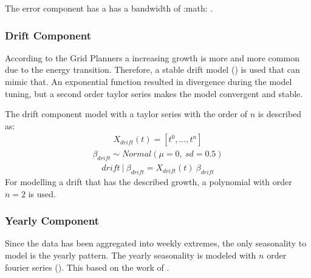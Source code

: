 \documentclass[letterpaper,10pt,english]{sphinxmanual}
\begin{document}
The error component has a has a bandwidth of :math: .


\subsubsection{Drift Component}
\label{\detokenize{modeling:drift-component}}
According to the Grid Planners a increasing growth is more and more common due to the energy transition.
Therefore, a stable drift model ({\hyperref[\detokenize{autoapi/src/model/model/index:src.model.model.drift_model}]{}}) is used that can mimic that.
An exponential function resulted in divergence during the model tuning, but a second order taylor series makes the model convergent and stable.

The drift component model with a taylor series with the order of \(n\) is described as:
\begin{equation*}
\begin{split}X_{drift}(t) = [t^0, ...,  t^n]\end{split}
\end{equation*}\begin{equation*}
\begin{split}\beta_{drift} \sim Normal(\mu=0, \:sd=0.5)\end{split}
\end{equation*}\begin{equation*}
\begin{split}drift\:|\:\beta_{drift} = X_{drift}(t)\:\beta_{drift}\end{split}
\end{equation*}
For modelling a drift that has the described growth, a polynomial with order \(n=2\) is used.


\subsubsection{Yearly Component}
\label{\detokenize{modeling:yearly-component}}
Since the data has been aggregated into weekly extremes, the only seasonality to model is the yearly pattern.
The yearly seasonality is modeled with \(n\) order fourier series ({\hyperref[\detokenize{autoapi/src/model/model/index:src.model.model.seasonality_model}]{}}).
This based on the work of .
\end{document}

